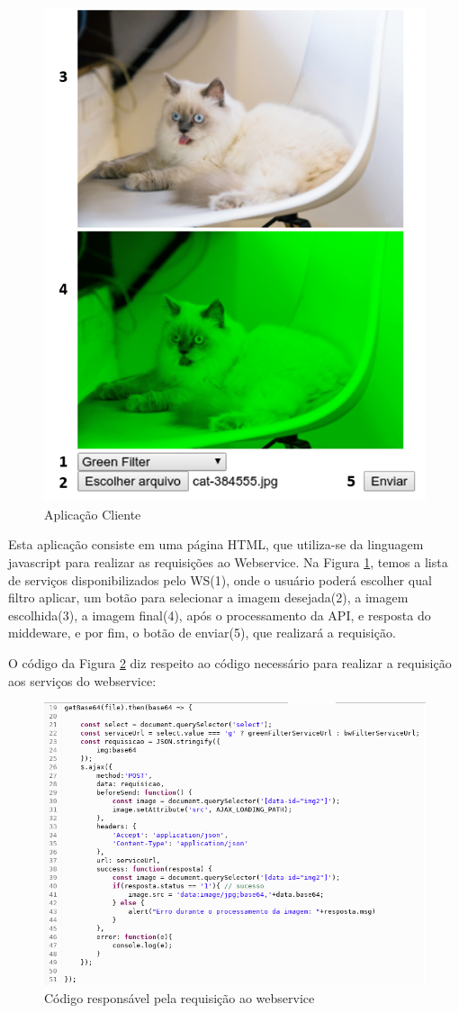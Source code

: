 \documentclass[12pt]{article}
\begin{document}
\begin{figure}[ht]
	\centering
	\includegraphics[width=.5\textwidth]{aplicacao-cliente.png}
	\caption{Aplicação Cliente}
	\label{fig:Figura6}
\end{figure}

Esta aplicação consiste em uma página HTML, que utiliza-se da linguagem javascript para realizar as requisições ao Webservice. Na Figura \ref{fig:Figura6}, temos a lista de serviços disponibilizados pelo WS(1), onde o usuário poderá escolher qual filtro aplicar, um botão para selecionar a imagem desejada(2), a imagem escolhida(3), a imagem final(4), após o processamento da API, e resposta do middeware, e por fim, o botão de enviar(5), que realizará a requisição.

O código da Figura \ref{fig:Figura7} diz respeito ao código necessário para realizar a requisição aos serviços do webservice:

\begin{figure}[ht]
	\centering
	\includegraphics[width=.9\textwidth]{cliente-requisicao.png}
	\caption{Código responsável pela requisição ao webservice}
	\label{fig:Figura7}
\end{figure}
\end{document}

